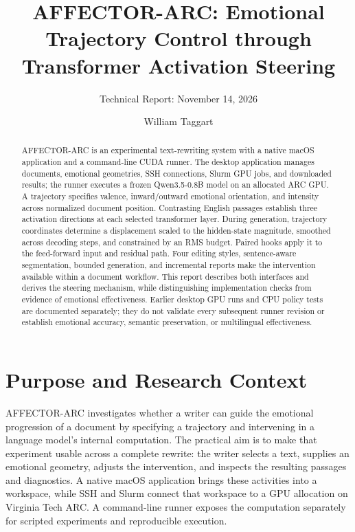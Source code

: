 \documentclass[manuscript,screen,nonacm]{acmart}
\begin{document}
\title{AFFECTOR-ARC: Emotional Trajectory Control through Transformer
Activation Steering}
\author{William Taggart}
\subtitle{Technical Report: November 14, 2026}
\begin{abstract}
AFFECTOR-ARC is an experimental text-rewriting system with a native macOS application and a command-line CUDA runner. The desktop application manages documents, emotional geometries, SSH connections, Slurm GPU jobs, and downloaded results; the runner executes a frozen Qwen3.5-0.8B model on an allocated ARC GPU. A trajectory specifies valence, inward/outward emotional orientation, and intensity across normalized document position. Contrasting English passages establish three activation directions at each selected transformer layer. During generation, trajectory coordinates determine a displacement scaled to the hidden-state magnitude, smoothed across decoding steps, and constrained by an RMS budget. Paired hooks apply it to the feed-forward input and residual path. Four editing styles, sentence-aware segmentation, bounded generation, and incremental reports make the intervention available within a document workflow. This report describes both interfaces and derives the steering mechanism, while distinguishing implementation checks from evidence of emotional effectiveness. Earlier desktop GPU runs and CPU policy tests are documented separately; they do not validate every subsequent runner revision or establish emotional accuracy, semantic preservation, or multilingual effectiveness.
\end{abstract}
\maketitle
\section{Purpose and Research Context}\label{literature-review-activation-steering-and-emotion}\label{problem-and-operating-principle}

AFFECTOR-ARC investigates whether a writer can guide the emotional progression of a document by specifying a trajectory and intervening in a language model's internal computation. The practical aim is to make that experiment usable across a complete rewrite: the writer selects a text, supplies an emotional geometry, adjusts the intervention, and inspects the resulting passages and diagnostics. A native macOS application brings these activities into a workspace, while SSH and Slurm connect that workspace to a GPU allocation on Virginia Tech ARC. A command-line runner exposes the computation separately for scripted experiments and reproducible execution.
\end{document}
